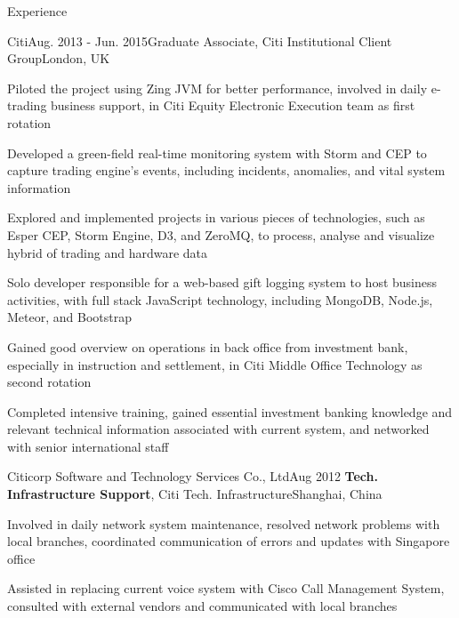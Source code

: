 \documentclass{resume} %
\begin{document}
\begin{rSection}{Experience}
        \begin{rSubsection}{Citi}{Aug. 2013 - Jun. 2015}{Graduate Associate, Citi Institutional Client Group}{London, UK}
            \item Piloted the project using Zing JVM for better performance,
            involved in daily e-trading business support, in Citi Equity Electronic Execution team as first rotation
            \item Developed a green-field real-time monitoring system with Storm and CEP to capture trading engine's events,
            including incidents, anomalies, and vital system information
            \item Explored and implemented projects in various pieces of technologies, such as Esper CEP,
            Storm Engine, D3, and ZeroMQ, to process, analyse and visualize hybrid of trading and hardware data
            \item Solo developer responsible for a web-based gift logging system to host business activities,
            with full stack JavaScript technology, including MongoDB, Node.js, Meteor, and Bootstrap
            \item Gained good overview on operations in back office from investment bank, especially in instruction and settlement,
            in Citi Middle Office Technology as second rotation
            \item Completed intensive training, gained essential investment banking knowledge and relevant technical information
            associated with current system, and networked with senior international staff
        \end{rSubsection}

        \begin{rSubsection}{Citicorp Software and Technology Services Co., Ltd}{Aug 2012}
        {\textbf{Tech. Infrastructure Support}, Citi Tech. Infrastructure}{Shanghai, China}
            \item Involved in daily network system maintenance, resolved network problems with local branches,
            coordinated communication of errors and updates with Singapore office
            \item Assisted in replacing current voice system with Cisco Call Management System,
            consulted with external vendors and communicated with local branches
        \end{rSubsection}


\end{rSection}
\end{document}
